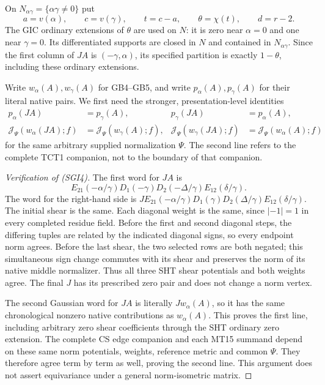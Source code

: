 On $N_{\alpha\gamma}=\{\alpha\gamma\ne0\}$ put
\[
 a=v(\alpha),\qquad c=v(\gamma),\qquad t=c-a,
 \qquad \theta=\chi(t),\qquad d=r-2.
 \tag{SGI3}
\]
The GIC ordinary extensions of $\theta$ are used on $N$: it is zero
near $\alpha=0$ and one near $\gamma=0$.  Its differentiated
supports are closed in $N$ and contained in $N_{\alpha\gamma}$.
Since the first column of $JA$ is $(-\gamma,\alpha)$, its specified
partition is exactly $1-\theta$, including these ordinary extensions.

Write $w_\alpha(A),w_\gamma(A)$ for GB4--GB5, and write
$p_\alpha(A),p_\gamma(A)$ for their literal native pairs.  We first
need the stronger, presentation-level identities
\[
 \begin{split}
 p_\alpha(JA)&=p_\gamma(A),&
 p_\gamma(JA)&=p_\alpha(A),\\
 \mathcal J_\Psi(w_\alpha(JA);f)&=
                  \mathcal J_\Psi(w_\gamma(A);f),&
 \mathcal J_\Psi(w_\gamma(JA);f)&=
                  \mathcal J_\Psi(w_\alpha(A);f)
 \end{split}
 \tag{SGI4}
\]
for the same arbitrary supplied normalization $\Psi$.  The second
line refers to the complete TCT1 companion, not to the boundary of
that companion.

\begin{proof}[Verification of (SGI4)]
The first word for $JA$ is
\[
 E_{21}(-\alpha/\gamma)
 D_1(-\gamma)D_2(-\Delta/\gamma)E_{12}(\delta/\gamma).
 \tag{SGI5}
\]
The word for the right-hand side is
$J E_{21}(-\alpha/\gamma)D_1(\gamma)D_2(\Delta/\gamma)
E_{12}(\delta/\gamma)$.
The initial shear is the same.  Each diagonal weight is the same,
since $|-1|=1$ in every completed residue field.  Before the first
and second diagonal steps, the differing tuples are related by
the indicated diagonal signs, so every endpoint norm agrees.
Before the last shear, the two selected rows are both negated;
this simultaneous sign change commutes with its shear and preserves
the norm of its native middle normalizer.  Thus all three SHT shear
potentials and both weights agree.  The final $J$ has its prescribed
zero pair and does not change a norm vertex.

The second Gaussian word for $JA$ is literally $Jw_\alpha(A)$,
so it has the same chronological nonzero native contributions as
$w_\alpha(A)$.  This proves the first line, including arbitrary zero
shear coefficients through the SHT ordinary zero extension.  The
complete CS edge companion and each MT15 summand depend on these
same norm potentials, weights, reference metric and common $\Psi$.
They therefore agree term by term as well, proving the second line.
This argument does not assert equivariance under a general
norm-isometric matrix.
\end{proof}

